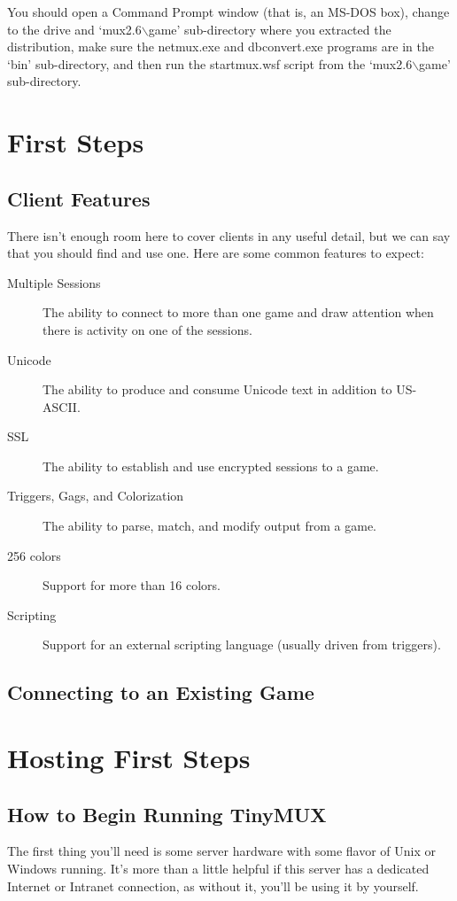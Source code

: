 \documentclass[10pt,letterpaper]{book}
\begin{document}
You should open a Command Prompt window (that is, an MS-DOS box), change to
the drive and `mux2.6$\backslash$game' sub-directory where you extracted the
distribution, make sure the netmux.exe and dbconvert.exe
programs are in the `bin' sub-directory, and then run the startmux.wsf
script from the `mux2.6$\backslash$game' sub-directory.

\chapter{First Steps}
\section{Client Features}
There isn't enough room here to cover clients in any useful detail, but we can
say that you should find and use one.
Here are some common features to expect:
\begin{description}
\item[Multiple Sessions]
The ability to connect to more than one game and draw attention when there is activity on one of the sessions.

\item[Unicode]
The ability to produce and consume Unicode text in addition to US-ASCII.

\item[SSL]
The ability to establish and use encrypted sessions to a game.

\item[Triggers, Gags, and Colorization]
The ability to parse, match, and modify output from a game.

\item[256 colors]
Support for more than 16 colors.

\item[Scripting]
Support for an external scripting language (usually driven from triggers).

\end{description}

\section{Connecting to an Existing Game}

\chapter{Hosting First Steps}
\section{How to Begin Running TinyMUX}
The first thing you'll need is some server hardware with some flavor of Unix or
Windows running. It's more than a little helpful if this server has a dedicated
Internet or Intranet connection, as without it, you'll be using it by yourself.
\end{document}
